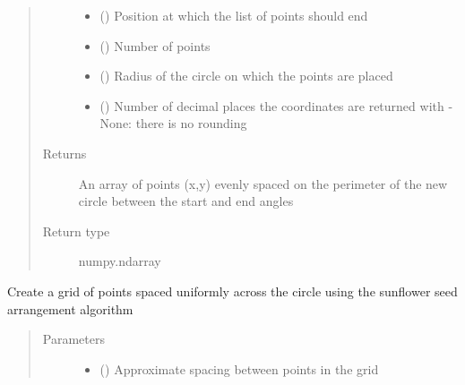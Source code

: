 \documentclass[letterpaper,10pt,english]{sphinxmanual}
\begin{document}
\begin{fulllineitems}
\begin{fulllineitems}
\begin{quote}
\begin{description}
\begin{itemize}
\item {} 
 () \textendash{} Position at which the list of points should end

\item {} 
 () \textendash{} Number of points

\item {} 
 () \textendash{} Radius of the circle on which the points are placed

\item {} 
 () \textendash{} Number of decimal places the coordinates are returned with - None: there is no rounding

\end{itemize}

\item[{Returns}] \leavevmode
An array of points (x,y) evenly spaced on the perimeter of the new circle between the start and end angles

\item[{Return type}] \leavevmode
numpy.ndarray

\end{description}\end{quote}

\end{fulllineitems}


\begin{fulllineitems}
\label{\detokenize{source/pyzones:pyzones.Circle.get_grid}}
Create a grid of points spaced uniformly across the circle using the sunflower seed arrangement algorithm
\begin{quote}\begin{description}
\item[{Parameters}] \leavevmode\begin{itemize}
\item {} 
 () \textendash{} Approximate spacing between points in the grid


\end{itemize}
\end{description}
\end{quote}
\end{fulllineitems}
\end{fulllineitems}
\end{document}
